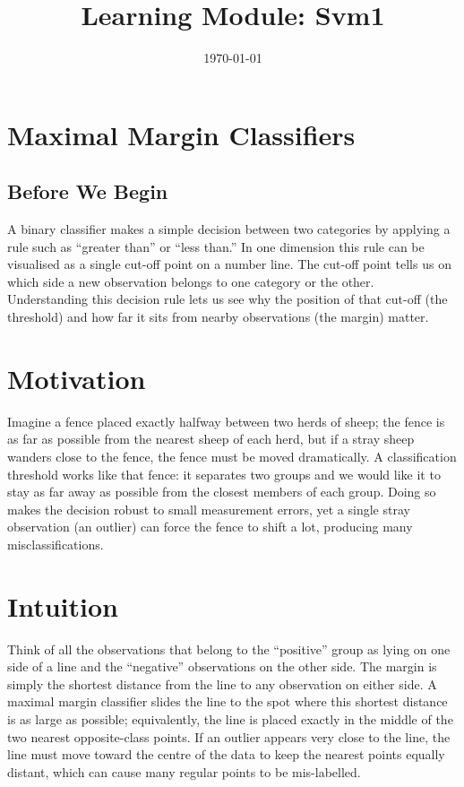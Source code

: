 \documentclass[12pt, a4paper]{article}
\title{Learning Module: Svm1}
\author{}
\date{\today}
\begin{document}
\maketitle
\thispagestyle{empty}
\newpage

\tableofcontents
\newpage


\section{Maximal Margin Classifiers}

\subsection{Before We Begin}
A binary classifier makes a simple decision between two categories by applying a rule such as ``greater than'' or ``less than.''  
In one dimension this rule can be visualised as a single cut-off point on a number line.  
The cut-off point tells us on which side a new observation belongs to one category or the other.  
Understanding this decision rule lets us see why the position of that cut-off (the threshold) and how far it sits from nearby observations (the margin) matter.  

\section{Motivation}
Imagine a fence placed exactly halfway between two herds of sheep; the fence is as far as possible from the nearest sheep of each herd, but if a stray sheep wanders close to the fence, the fence must be moved dramatically.  
A classification threshold works like that fence: it separates two groups and we would like it to stay as far away as possible from the closest members of each group.  
Doing so makes the decision robust to small measurement errors, yet a single stray observation (an outlier) can force the fence to shift a lot, producing many misclassifications.  

\section{Intuition}
Think of all the observations that belong to the ``positive'' group as lying on one side of a line and the ``negative'' observations on the other side.  
The margin is simply the shortest distance from the line to any observation on either side.  
A maximal margin classifier slides the line to the spot where this shortest distance is as large as possible; equivalently, the line is placed exactly in the middle of the two nearest opposite-class points.  
If an outlier appears very close to the line, the line must move toward the centre of the data to keep the nearest points equally distant, which can cause many regular points to be mis-labelled.  
\end{document}
